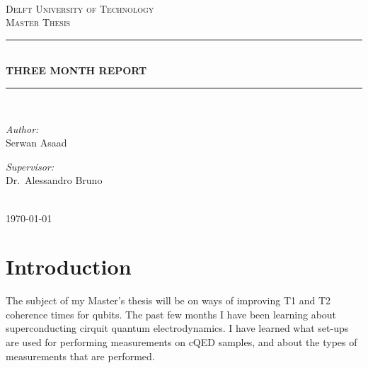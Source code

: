 \documentclass[12pt]{report}
\newcommand{\HRule}[1]{\rule{\linewidth}{#1}}
\begin{document}
\begin{titlepage}
\begin{center}
~\\ [4.0cm]
\textsc{\LARGE Delft University of Technology}
\\ [3.0cm]
\textsc{\Large Master Thesis}
\HRule{0.5pt} \\
\LARGE \textbf{\uppercase{Three month report}}
\HRule{2pt} \\ [0.5cm]

\noindent
\begin{minipage}{0.4\textwidth}
\begin{flushleft} \large
\emph{Author:}\\
Serwan Asaad
\end{flushleft}
\end{minipage}%
\begin{minipage}{0.4\textwidth}
\begin{flushright} \large
\emph{Supervisor:} \\
Dr.~Alessandro Bruno
\end{flushright}
\end{minipage}
\\ [3.0cm]
{\large \today}
\end{center}

\end{titlepage}


\author{
        Serwan Asaad
        Student ID: 4323475 \\
        Delft University of Technology \\
        Kavli Institute of Nanoschience\\
        Quantum Nanoscience Department\\
        Quantum Transport Group\\
        DiCarlo Lab}

\tableofcontents
\newpage

\sectionfont{\scshape}


\section*{Introduction}
The subject of my Master's thesis will be on ways of improving T1 and T2 coherence times for qubits. The past few months I have been learning about superconducting cirquit quantum electrodynamics. I have learned what set-ups are used for performing measurements on cQED samples, and about the types of measurements that are performed.
\end{document}

